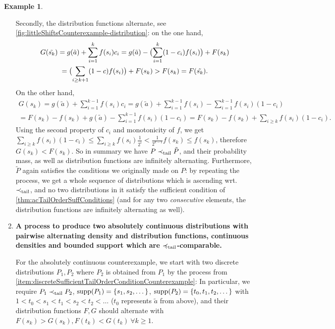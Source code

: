 \documentclass[a4paper]{scrreprt}
\theoremstyle{definition}
\newtheorem{ex}[thm]{Example} %
\begin{document}
\begin{ex}
\begin{enumerate}
            Secondly, the distribution functions alternate, see \autoref{fig:littleShiftsCounterexample-distribution}: on the one hand, 
            \begin{multline*}
                G(\tilde{s_k}) 
                = g(\tilde{a}) + \sum_{i=1}^k f(s_i)c_i 
                = g(\tilde{a}) - \bigl(\sum_{i=1}^k (1-c_i) f(s_i)\bigr) + F(s_k) \\
                = \bigl(\sum_{i \geq k+1} (1-c) f(s_i)\bigr) + F(s_k) > F(s_k) = F(\tilde{s_k}).
            \end{multline*}
            On the other hand, 
            \begin{multline*}
                G(s_k)
                = g(\tilde{a}) + \sum_{i=1}^{k-1} f(s_i)c_i 
                = g(\tilde{a}) + \sum_{i=1}^{k-1} f(s_i) - \sum_{i=1}^{k-1} f(s_i) (1-c_i) \\
                = F(s_k) - f(s_k) + g(\tilde{a}) - \sum_{i=1}^{k-1} f(s_i) (1-c_i) 
                = F(s_k) - f(s_k) + \sum_{i \geq k} f(s_i) (1-c_i).
            \end{multline*}
            Using the second property of $c_i$ and monotonicity of $f$, we get
            $\sum_{i \geq k} f(s_i) (1-c_i) \leq \sum_{i \geq k} f(s_i) \frac{1}{2^i} < \frac{1}{2^{k-1}} f(s_k) \leq f(s_k)$,
            therefore $G(s_k) < F(s_k)$.
            So in summary we have $P \prec_{\text{tail}} \tilde{P}$, and their probability mass, as well as distribution functions are infinitely alternating.
            Furthermore, $\tilde{P}$ again satisfies the conditions we originally made on $P$: by repeating the process, we get a whole sequence of distributions which is ascending wrt. $\prec_{\text{tail}}$, and no two distributions in it satisfy the sufficient condition of \ref{thm:acTailOrderSuffConditions} (and for any two \emph{consecutive} elements, the distribution functions are infinitely alternating as well).
            
            \item 
            \textbf{A process to produce two absolutely continuous distributions with pairwise alternating density and distribution functions, continuous densities and bounded support which are $\preccurlyeq_{\text{tail}}$-comparable.}
            
            \label{item:acSufficientTailOrderConditionCounterexample}
            For the absolutely continuous counterexample, we start with two discrete distributions $P_1, P_2$ where $P_2$ is obtained from $P_1$ by the process from \ref{item:discreteSufficientTailOrderConditionCounterexample}: In particular, we require $P_1 \prec_{\text{tail}} P_2$, $\operatorname{supp}(P_1) = \{s_1, s_2, \dots\}$, $\operatorname{supp}(P_2) = \{t_0, t_1, t_2, \dots\}$ with $1 < t_0 < s_1 < t_1 < s_2 < t_2 < \dots$ ($t_0$ represents $\tilde{a}$ from above), and their distribution functions $F, G$ should alternate with $F(s_k) > G(s_k), F(t_k) < G(t_k) ~\forall k\geq 1$.
            

\end{enumerate}
\end{ex}
\end{document}
